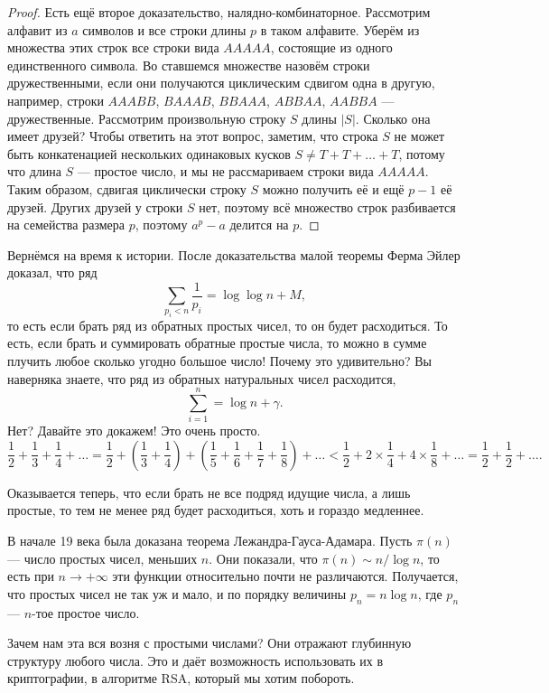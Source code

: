 \documentclass[12pt]{article}
\begin{document}
\begin{proof}
Есть ещё второе доказательство, налядно-комбинаторное. Рассмотрим алфавит из $a$ символов и все строки длины $p$ в таком алфавите. Уберём из множества этих строк все строки вида $AAAAA$, состоящие из одного единственного символа. Во ставшемся множестве назовём строки дружественными, если они получаются циклическим сдвигом одна в другую, например, строки $AAABB$, $BAAAB$, $BBAAA$, $ABBAA$, $AABBA$ --- дружественные. Рассмотрим произвольную строку $S$ длины $|S|$. Сколько она имеет друзей? Чтобы ответить на этот вопрос, заметим, что строка $S$ не может быть конкатенацией нескольких одинаковых кусков $S \neq T + T + \ldots + T$, потому что длина $S$ --- простое число, и мы не рассмариваем строки вида $AAAAA$. Таким образом, сдвигая циклически строку $S$ можно получить её и ещё $p - 1$ её друзей. Других друзей у строки $S$ нет, поэтому всё множество строк разбивается на семейства размера $p$, поэтому $a^p - a$ делится на $p$.
\end{proof}

Вернёмся на время к истории. После доказательства малой теоремы Ферма Эйлер доказал, что ряд $$\sum\limits_{p_i < n} \frac{1}{p_i} = \log \log n + M,$$ то есть если брать ряд из обратных простых чисел, то он будет расходиться. То есть, если брать и суммировать обратные простые числа, то можно в сумме плучить любое сколько угодно большое число! Почему это удивительно? Вы наверняка знаете, что ряд из обратных натуральных чисел расходится, $$\sum \limits_{i = 1}^n = \log n + \gamma.$$ Нет? Давайте это докажем! Это очень просто. $$\frac{1}{2} + \frac{1}{3} + \frac{1}{4} + \ldots = \frac{1}{2} + \left(\frac{1}{3} + \frac{1}{4}\right) + \left(\frac{1}{5} + \frac{1}{6} + \frac{1}{7} + \frac{1}{8}\right) + \ldots < \frac{1}{2} + 2 \times \frac{1}{4} + 4 \times \frac{1}{8} + \ldots = \frac{1}{2} + \frac{1}{2} + \ldots.$$

Оказывается теперь, что если брать не все подряд идущие числа, а лишь простые, то тем не менее ряд будет расходиться, хоть и гораздо медленнее.

В начале 19 века была доказана теорема Лежандра-Гауса-Адамара. Пусть $\pi(n)$ --- число простых чисел, меньших $n$. Они показали, что $\pi(n) \sim n / \log n$, то есть при $n \to +\infty$ эти функции относительно почти не различаются. Получается, что простых чисел не так уж и мало, и по порядку величины $p_n = n \log n$, где $p_n$ --- $n$-тое простое число.

Зачем нам эта вся возня с простыми числами? Они отражают глубинную структуру любого числа. Это и даёт возможность использовать их в криптографии, в алгоритме RSA, который мы хотим побороть. 
\end{document}
